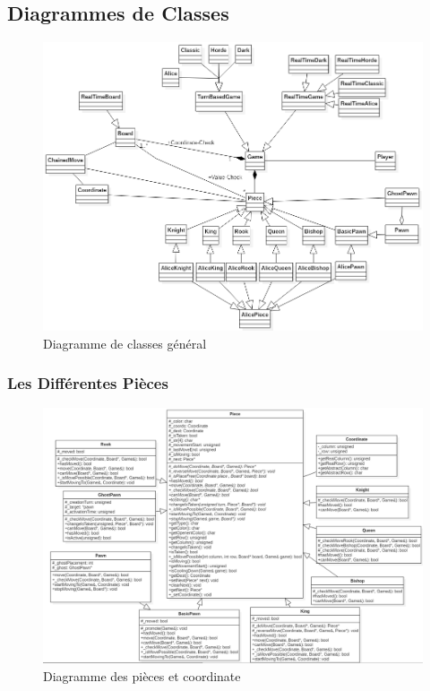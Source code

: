 \documentclass[10pt, a4paper]{article}
\begin{document}
\subsection{Diagrammes de Classes}
\begin{figure}[H]
\centering
\includegraphics[scale=0.5]{ClassDiagram.png}
\caption{Diagramme de classes général}
\end{figure}

\subsubsection{Les Différentes Pièces}
\begin{figure}[H]
\centering
\includegraphics[scale=0.5]{pieces_diagram.png}
\caption{Diagramme des pièces et coordinate}
\end{figure}
\end{document}
